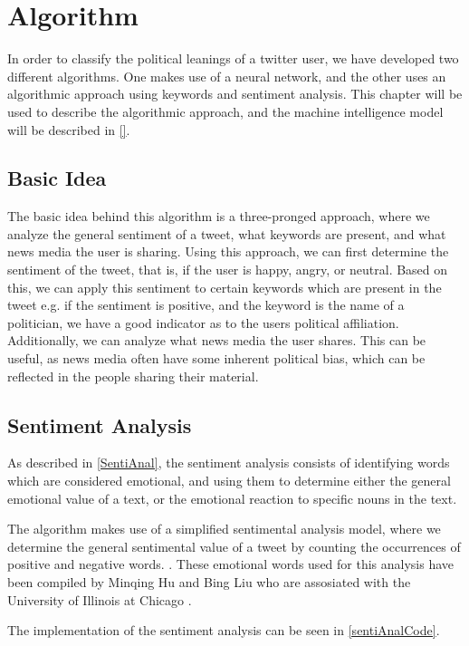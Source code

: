 \chapter{Algorithm}
In order to classify the political leanings of a twitter user, we have developed
two different algorithms. One makes use of a neural network, and the other uses
an algorithmic approach using keywords and sentiment analysis. This chapter will be
used to describe the algorithmic approach, and the machine intelligence model
will be described in \autoref{}.

\section{Basic Idea}
The basic idea behind this algorithm is a three-pronged approach, where we
analyze the general sentiment of a tweet, what keywords are present, and what
news media the user is sharing. Using this approach, we can first determine the
sentiment of the tweet, that is, if the user is happy, angry, or neutral. Based
on this, we can apply this sentiment to certain keywords which are present in
the tweet e.g. if the sentiment is positive, and the keyword is the name of a
politician, we have a good indicator as to the users political affiliation.
Additionally, we can analyze what news media the user shares. This can be
useful, as news media often have some inherent political bias, which can be
reflected in the people sharing their material.

\section{Sentiment Analysis}
As described in \autoref{SentiAnal}, the sentiment analysis consists of
identifying words which are considered emotional, and using them to determine
either the general emotional value of a text, or the emotional reaction to
specific nouns in the text.\nl

The algorithm makes use of a simplified sentimental analysis model, where we
determine the general sentimental value of a tweet by counting the occurrences
of positive and negative words. . These emotional words used for this
analysis have been compiled by Minqing Hu and Bing Liu who are assosiated with
the University of Illinois at Chicago \citep{Hu:2004:MSC:1014052.1014073}.\nl

The implementation of the sentiment analysis can be seen in
\autoref{sentiAnalCode}.\\

